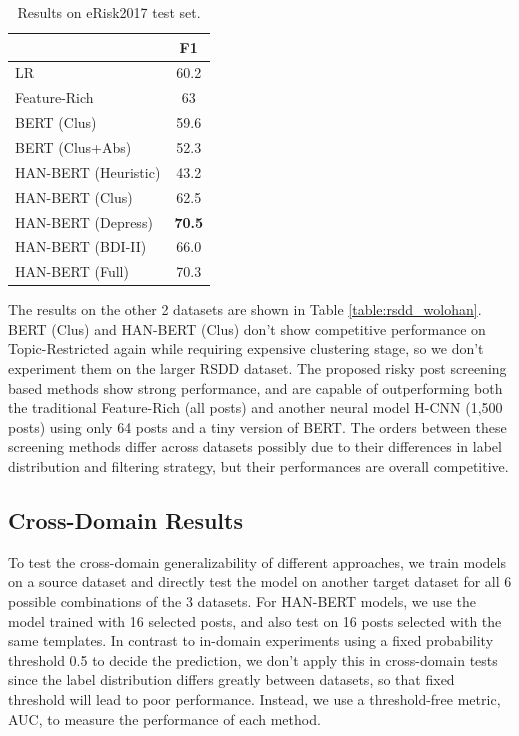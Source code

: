 \begin{table}[t]
    \centering
    \small
    \begin{tabular}{l|c}
        \hline
        {} & F1 \\
        \hline
        LR & 60.2 \\
        Feature-Rich & 63 \\
        \hline
        BERT (Clus) & 59.6 \\
        BERT (Clus+Abs) & 52.3 \\
        HAN-BERT (Heuristic) & 43.2 \\
        HAN-BERT (Clus) & 62.5 \\
        \hline
        HAN-BERT (Depress) & \textbf{70.5} \\
        HAN-BERT (BDI-II) & 66.0 \\
        HAN-BERT (Full) & 70.3 \\
        \hline
    \end{tabular}
    \caption{\label{table:erisk2017} Results on eRisk2017 test set.}
\end{table}

The results on the other 2 datasets are shown in Table \ref{table:rsdd_wolohan}. BERT (Clus) and HAN-BERT (Clus) don't show competitive performance on Topic-Restricted again while requiring expensive clustering stage, so we don't experiment them on the larger RSDD dataset. The proposed risky post screening based methods show strong performance, and are capable of outperforming both the traditional Feature-Rich (all posts) and another neural model H-CNN (1,500 posts) using only 64 posts and a tiny version of BERT. The orders between these screening methods differ across datasets possibly due to their differences in label distribution and filtering strategy, but their performances are overall competitive.

\subsection{Cross-Domain Results}

To test the cross-domain generalizability of different approaches, we train models on a source dataset and directly test the model on another target dataset for all 6 possible combinations of the 3 datasets. For HAN-BERT models, we use the model trained with 16 selected posts, and also test on 16 posts selected with the same templates. In contrast to in-domain experiments using a fixed probability threshold 0.5 to decide the prediction, we don't apply this in cross-domain tests since the label distribution differs greatly between datasets, so that fixed threshold will lead to poor performance. Instead, we use a threshold-free metric, AUC, to measure the performance of each method.

